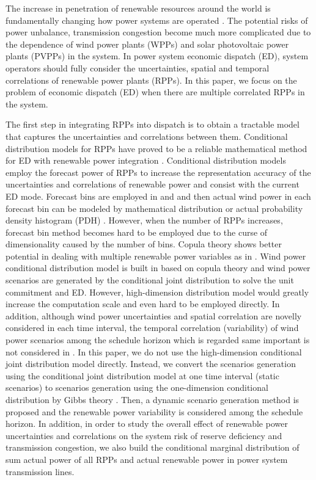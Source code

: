 The increase in penetration of renewable resources around the world is fundamentally changing how power systems are operated \cite{Risk_Based_UC}. The potential risks of power unbalance, transmission congestion become much more complicated due to the dependence of wind power plants (WPPs) and solar photovoltaic power plants (PVPPs) in the system. In power system economic dispatch (ED), system operators should fully consider the uncertainties, spatial and temporal correlations of renewable power plants (RPPs). In this paper, we focus on the problem of economic dispatch (ED) when there are multiple correlated RPPs in the system.


The first step in integrating RPPs into dispatch is to obtain a tractable model that captures the uncertainties and correlations between them. Conditional distribution models for RPPs have proved to be a reliable mathematical method for ED with renewable power integration \cite{Versatile}\cite{sce_generation_Ma}\cite{copula_Zhang}. Conditional distribution models employ the forecast power of RPPs to increase the representation accuracy of the uncertainties and correlations of renewable power and consist with the current ED mode. Forecast bins are employed in \cite{Versatile} and \cite{sce_generation_Ma} and then actual wind power in each forecast bin can be modeled by mathematical distribution \cite{Versatile} or actual probability density histogram (PDH) \cite{sce_generation_Ma}. However, when the number of RPPs increases, forecast bin method becomes hard to be employed due to the curse of dimensionality caused by the number of bins. Copula theory shows better potential in dealing with multiple renewable power variables as in \cite{copula_Zhang}. Wind power conditional distribution model is built in \cite{copula_Zhang} based on copula theory and wind power scenarios are generated by the conditional joint distribution to solve the unit commitment and ED. However, high-dimension distribution model would greatly increase the computation scale and even hard to be employed directly. In addition, although wind power uncertainties and spatial correlation are novelly considered in each time interval, the temporal correlation (variability) of wind power scenarios among the schedule horizon which is regarded same important  \cite{sce_generation_Ma}\cite{PCA} is not considered in \cite{copula_Zhang}. In this paper, we do not use the high-dimension conditional joint distribution model directly. Instead, we convert the scenarios generation using the conditional joint distribution model at one time interval (static scenarios) to scenarios generation using the one-dimension conditional distribution by Gibbs theory \cite{Gibbs}. Then, a dynamic scenario generation method is proposed and the renewable power variability is considered among the schedule horizon. In addition, in order to study the overall effect of renewable power uncertainties and correlations on the system risk of reserve deficiency and transmission congestion, we also build the conditional marginal distribution of sum actual power of all RPPs and actual renewable power in power system transmission lines.


